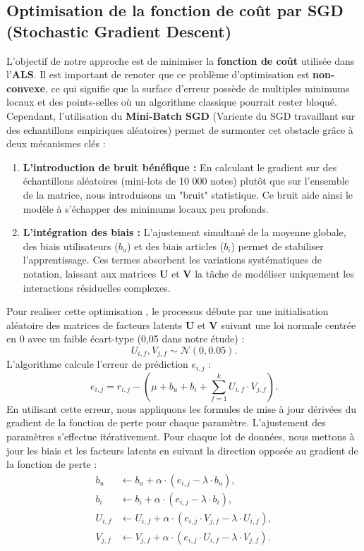 \documentclass[11pt,a4paper]{article}
\newcommand{\bU}{\boldsymbol{U}}
\newcommand{\bV}{\boldsymbol{V}}
\newcommand{\pkg}{\textbf}
\begin{document}
\subsection{Optimisation de la fonction de coût par SGD (Stochastic Gradient Descent)}
L'objectif de notre approche est de minimiser la \textbf{fonction de coût} utilisée dans l'\textbf{ALS}. Il est important de renoter que ce problème d'optimisation est \textbf{non-convexe}, ce qui signifie que la surface d'erreur possède de multiples minimums locaux et des points-selles où un algorithme classique pourrait rester bloqué. Cependant, l'utilisation du \pkg{Mini-Batch SGD} (Variente du SGD travaillant sur des echantillons empiriques aléatoires) permet de surmonter cet obstacle grâce à deux mécanismes clés :
\begin{enumerate}
\item \textbf{L'introduction de bruit bénéfique :} En calculant le gradient sur des échantillons aléatoires (mini-lots de 10 000 notes) plutôt que sur l'ensemble de la matrice, nous introduisons un "bruit" statistique. Ce bruit aide ainsi le modèle à s'échapper des minimums locaux peu profonds.
\item \textbf{L'intégration des biais :} L'ajustement simultané de la moyenne globale, des biais utilisateurs ($b_u$) et des biais articles ($b_i$) permet de stabiliser l'apprentissage. Ces termes absorbent les variations systématiques de notation, laissant aux matrices $\bU$ et $\bV$ la tâche de modéliser uniquement les interactions résiduelles complexes.
\end{enumerate}

Pour realiser cette optimisation , le processus débute par une initialisation aléatoire des matrices de facteurs latents $\bU$ et $\bV$ suivant une loi normale centrée en 0 avec un faible écart-type (0,05 dans notre étude) :
\begin{equation}
U_{i,f}, V_{j,f} \sim \mathcal{N}(0, 0.05).
\end{equation}
L'algorithme calcule l'erreur de prédiction $e_{i,j}$ :
\begin{equation}
e_{i,j} = r_{i,j} - \left( \mu + b_u + b_i + \sum_{f=1}^{k} U_{i,f} \cdot V_{j,f} \right).
\end{equation}
En utilisant cette erreur, nous appliquons les formules de mise à jour dérivées du gradient de la fonction de perte pour chaque paramètre. L'ajustement des paramètres s'effectue itérativement. Pour chaque lot de données, nous mettons à jour les biais et les facteurs latents en suivant la direction opposée au gradient de la fonction de perte \citep{koren2009matrix}:
\begin{align}
    b_u &\leftarrow b_u + \alpha \cdot (e_{i,j} - \lambda \cdot b_u), \\
    b_i &\leftarrow b_i + \alpha \cdot (e_{i,j} - \lambda \cdot b_i), \\
    U_{i,f} &\leftarrow U_{i,f} + \alpha \cdot (e_{i,j} \cdot V_{j,f} - \lambda \cdot U_{i,f}), \\
    V_{j,f} &\leftarrow V_{j,f} + \alpha \cdot (e_{i,j} \cdot U_{i,f} - \lambda \cdot V_{j,f}).
\end{align}
\end{document}
